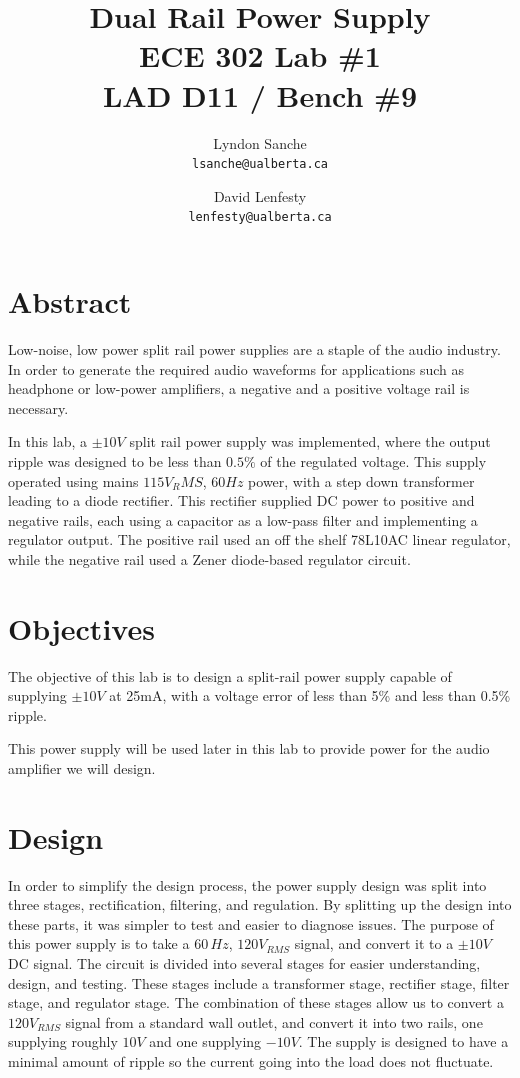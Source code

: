 \documentclass[12pt]{article}
\title{ {\Huge Dual Rail Power Supply } \\
    ECE 302 Lab \#1 \\ LAD D11 / Bench \#9}
\author{
    Lyndon Sanche\\
    \texttt{lsanche@ualberta.ca}
    \and
    David Lenfesty\\
    \texttt{lenfesty@ualberta.ca}
}
\begin{document}

\maketitle


\section{Abstract}

Low-noise, low power split rail power supplies are a staple of the audio industry.
In order to generate the required audio waveforms for applications such as headphone or
low-power amplifiers, a negative and a positive voltage rail is necessary.

In this lab, a $\pm10 V$ split rail power supply was implemented, 
where the output ripple was designed to be less than $ 0.5 \% $ of the
regulated voltage. This supply operated using mains $115 V_RMS$, $60Hz $ power, with
a step down transformer leading to a diode rectifier. This rectifier supplied DC power to
positive and negative rails, each using a capacitor as a low-pass filter and implementing
a regulator output. The positive rail used an off the shelf 78L10AC linear regulator,
while the negative rail used a Zener diode-based regulator circuit.


\section{Objectives}

The objective of this lab is to design a split-rail power supply capable of supplying
$\pm 10V$ at 25mA, with a voltage error of less than 5\% and less than 0.5\% ripple.

This power supply will be used later in this lab to provide power for the audio amplifier
we will design.

\section{Design}

In order to simplify the design process, the power supply design was split into three
stages, rectification, filtering, and regulation. By splitting up the design into these
parts, it was simpler to test and easier to diagnose issues.
The purpose of this power supply is to take a $60\,Hz$, $120 V_{RMS}$ signal, and convert it to a $\pm10 V$ DC signal. The circuit is divided into
several stages for easier understanding, design, and testing. These stages include a transformer stage, rectifier stage, filter stage, and regulator stage. The combination 
of these stages allow us to convert a $120 V_{RMS}$ signal from a standard wall outlet, and convert it into two rails, one supplying roughly $10 V$ and one supplying $-10 V$. 
The supply is designed to have a minimal amount of ripple so the current going into the load does not fluctuate.
\end{document}
